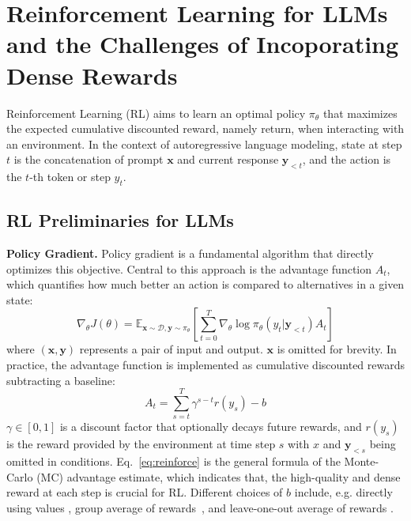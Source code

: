 \section{Reinforcement Learning for LLMs and the Challenges of Incoporating Dense Rewards}


Reinforcement Learning (RL) aims to learn an optimal policy $\pi_\theta$ that maximizes the expected cumulative discounted reward, namely return, when interacting with an environment.
In the context of autoregressive language modeling, state at step $t$ is the concatenation of prompt $\mathbf{x}$ and current response $\mathbf{y}_{<t}$, and the action is the $t$-th token or step $y_t$.


\subsection{RL Preliminaries for LLMs}
\textbf{Policy Gradient.}
Policy gradient is a fundamental algorithm that directly optimizes this objective. Central to this approach is the advantage function $A_t$, which quantifies how much better an action is compared to alternatives in a given state:
\vspace{-10pt}
\begin{equation}
    \nabla_\theta J(\theta) = \mathbb{E}_{\mathbf{x} \sim \mathcal{D},\mathbf{y} \sim \pi_\theta}\left[\sum_{t=0}^{T} \nabla_\theta \log \pi_\theta(y_t|\mathbf{y}_{<t}) A_t\right]
\end{equation}
where $\left(\mathbf{x},\mathbf{y}\right)$ represents a pair of input and output. $\mathbf{x}$ is omitted for brevity. In practice, the advantage function is implemented as cumulative discounted rewards subtracting a baseline:
\begin{equation}
\label{eq:reinforce}
    A_t = \sum_{s=t}^T \gamma^{s-t} r(y_s) - b
\end{equation}
$\gamma \in [0,1]$ is a discount factor that optionally decays future rewards, and $r(y_s)$ is the reward provided by the environment at time step $s$ with $x$ and $\mathbf{y}_{<s}$ being omitted in conditions.
Eq.~\ref{eq:reinforce} is the general formula of the Monte-Carlo (MC) advantage estimate, which indicates that, the high-quality and dense reward at each step is crucial for RL.
Different choices of $b$ include, e.g. directly using values \cite{williams1992simple}, group average of rewards~\citep{deepseek-math}, and leave-one-out average of rewards \cite{ahmadian2024back, Kool2019Buy4R}.


